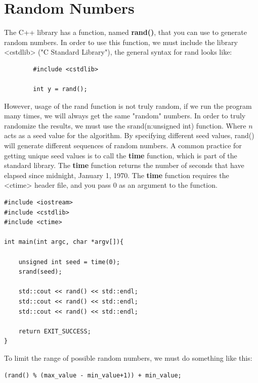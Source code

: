 \documentclass{report}
\begin{document}
    \section{\LARGE Random Numbers}
    \bigbreak \noindent 
    The C++ library has a function, named \textbf{rand()}, that you can use to generate random numbers. In order to use this function, we must include the library <cstdlib> ("C Standard Library"), the general syntax for rand looks like:
    \smallbreak \noindent
    \sepline
    \begin{verbatim}
        #include <cstdlib>
        
        int y = rand();
    \end{verbatim}
    \sepline
    \bigbreak \noindent 
    However, usage of the rand function is not truly random, if we run the program many times, we will always get the same "random" numbers. In order to truly randomize the results, we must use the srand(n:unsigned int) function. Where $n$ acts as a seed value for the algorithm. By specifying different seed values, rand() will generate different sequences of random numbers.
    \bigbreak \noindent 
    A common practice for getting unique seed values is to call the \textbf{time} function, which is part of the standard library. The \textbf{time} function returns the number of seconds that have elapsed since midnight, January 1, 1970. The \textbf{time} function requires the <ctime> header file, and you pass 0 as an argument to the function.
    \smallbreak \noindent
    \sepline
    \begin{verbatim}
#include <iostream>
#include <cstdlib>
#include <ctime>

int main(int argc, char *argv[]){

    unsigned int seed = time(0);
    srand(seed);

    std::cout << rand() << std::endl; 
    std::cout << rand() << std::endl; 
    std::cout << rand() << std::endl; 

    return EXIT_SUCCESS;
}
    \end{verbatim}
    \sepline
    \bigbreak \noindent 
    To limit the range of possible random numbers, we must do something like this:
    \smallbreak \noindent
    \sepline
    \begin{verbatim}
(rand() % (max_value - min_value+1)) + min_value;   
    \end{verbatim}
    \sepline

    \pagebreak \bigbreak \noindent 
\end{document}
